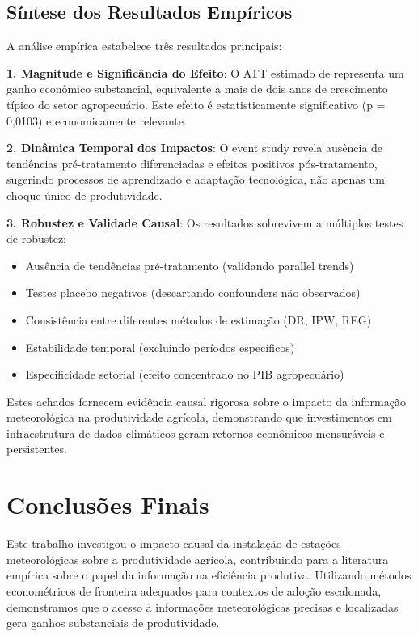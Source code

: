 \documentclass[
	12pt,				%
	oneside,			%
	a4paper,			%
	english,			%
	french,				%
	spanish,			%
	brazil				%
	]{abntex2}
\begin{document}
\section{Síntese dos Resultados Empíricos}

A análise empírica estabelece três resultados principais:

\textbf{1. Magnitude e Significância do Efeito}: O ATT estimado de \mainattpct{} representa um ganho econômico substancial, equivalente a mais de dois anos de crescimento típico do setor agropecuário. Este efeito é estatisticamente significativo (p = 0,0103) e economicamente relevante.

\textbf{2. Dinâmica Temporal dos Impactos}: O event study revela ausência de tendências pré-tratamento diferenciadas e efeitos positivos pós-tratamento, sugerindo processos de aprendizado e adaptação tecnológica, não apenas um choque único de produtividade.

\textbf{3. Robustez e Validade Causal}: Os resultados sobrevivem a múltiplos testes de robustez:
\begin{itemize}
\item Ausência de tendências pré-tratamento (validando parallel trends)
\item Testes placebo negativos (descartando confounders não observados)
\item Consistência entre diferentes métodos de estimação (DR, IPW, REG)
\item Estabilidade temporal (excluindo períodos específicos)
\item Especificidade setorial (efeito concentrado no PIB agropecuário)
\end{itemize}

Estes achados fornecem evidência causal rigorosa sobre o impacto da informação meteorológica na produtividade agrícola, demonstrando que investimentos em infraestrutura de dados climáticos geram retornos econômicos mensuráveis e persistentes.

\chapter{Conclusões Finais}

Este trabalho investigou o impacto causal da instalação de estações meteorológicas sobre a produtividade agrícola, contribuindo para a literatura empírica sobre o papel da informação na eficiência produtiva. Utilizando métodos econométricos de fronteira adequados para contextos de adoção escalonada, demonstramos que o acesso a informações meteorológicas precisas e localizadas gera ganhos substanciais de produtividade.
\end{document}
